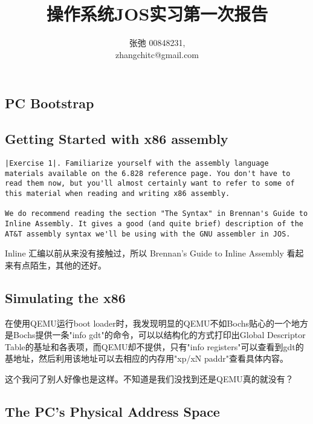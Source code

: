 \documentclass{article}
\begin{document}
\begin{CJK*}{UTF8}{gkai}

\title{操作系统JOS实习第一次报告}
\author{张弛 \hspace{1ex} 00848231, \\
        zhangchitc@gmail.com}

\maketitle
\tableofcontents
\newpage

\section{PC Bootstrap}

\subsection{Getting Started with x86 assembly}

\begin{lstlisting}[style=exercise]
|Exercise 1|. Familiarize yourself with the assembly language materials available on the 6.828 reference page. You don't have to read them now, but you'll almost certainly want to refer to some of this material when reading and writing x86 assembly.

We do recommend reading the section "The Syntax" in Brennan's Guide to Inline Assembly. It gives a good (and quite brief) description of the AT&T assembly syntax we'll be using with the GNU assembler in JOS.
\end{lstlisting}

Inline 汇编以前从来没有接触过，所以 Brennan's Guide to Inline Assembly 看起来有点陌生，其他的还好。

\subsection{Simulating the x86}

在使用QEMU运行boot loader时，我发现明显的QEMU不如Bochs贴心的一个地方是Bochs提供一条"info gdt"的命令，可以以结构化的方式打印出Global Descriptor Table的基址和各表项，而QEMU却不提供，只有"info registers"可以查看到gdt的基地址，然后利用该地址可以去相应的内存用"xp/xN paddr"查看具体内容。

这个我问了别人好像也是这样。不知道是我们没找到还是QEMU真的就没有？

\subsection{The PC's Physical Address Space}


\end{CJK*}
\end{document}
